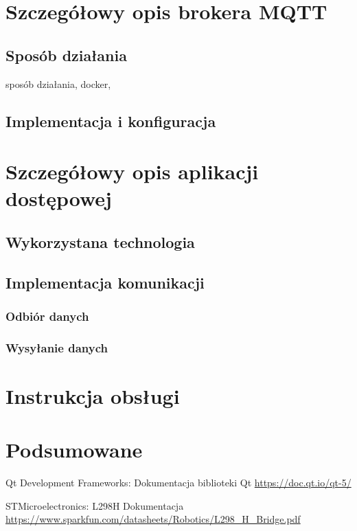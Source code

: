 \documentclass[eng, 11pt]{mgr}
\begin{document}
  \chapter{Szczegółowy opis brokera MQTT}
    \section{Sposób działania}
      sposób działania, docker, 

    \section{Implementacja i konfiguracja}
      

  \chapter{Szczegółowy opis aplikacji dostępowej}
    \section{Wykorzystana technologia}
    \section{Implementacja komunikacji}
      \subsection{Odbiór danych}
      \subsection{Wysyłanie danych}


  \chapter{Instrukcja obsługi}

  \chapter{Podsumowane}

  
  
  \begin{thebibliography}{9}

      Qt Development Frameworks: Dokumentacja biblioteki Qt \newline
      \url{https://doc.qt.io/qt-5/}

      STMicroelectronics: L298H Dokumentacja \newline
      \url{https://www.sparkfun.com/datasheets/Robotics/L298_H_Bridge.pdf}
      
  \end{thebibliography}


  \listoffigures
\end{document}
